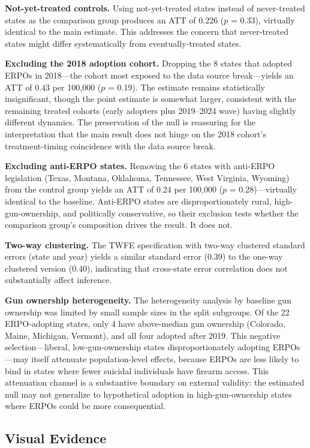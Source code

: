 \documentclass[12pt]{article}
\begin{document}
\textbf{Not-yet-treated controls.} Using not-yet-treated states instead of never-treated states as the comparison group produces an ATT of 0.226 ($p$ = 0.33), virtually identical to the main estimate. This addresses the concern that never-treated states might differ systematically from eventually-treated states.

\textbf{Excluding the 2018 adoption cohort.} Dropping the 8 states that adopted ERPOs in 2018---the cohort most exposed to the data source break---yields an ATT of 0.43 per 100,000 ($p$ = 0.19). The estimate remains statistically insignificant, though the point estimate is somewhat larger, consistent with the remaining treated cohorts (early adopters plus 2019--2024 wave) having slightly different dynamics. The preservation of the null is reassuring for the interpretation that the main result does not hinge on the 2018 cohort's treatment-timing coincidence with the data source break.

\textbf{Excluding anti-ERPO states.} Removing the 6 states with anti-ERPO legislation (Texas, Montana, Oklahoma, Tennessee, West Virginia, Wyoming) from the control group yields an ATT of 0.24 per 100,000 ($p$ = 0.28)---virtually identical to the baseline. Anti-ERPO states are disproportionately rural, high-gun-ownership, and politically conservative, so their exclusion tests whether the comparison group's composition drives the result. It does not.

\textbf{Two-way clustering.} The TWFE specification with two-way clustered standard errors (state and year) yields a similar standard error (0.39) to the one-way clustered version (0.40), indicating that cross-state error correlation does not substantially affect inference.

\textbf{Gun ownership heterogeneity.} The heterogeneity analysis by baseline gun ownership was limited by small sample sizes in the split subgroups. Of the 22 ERPO-adopting states, only 4 have above-median gun ownership (Colorado, Maine, Michigan, Vermont), and all four adopted after 2019. This negative selection---liberal, low-gun-ownership states disproportionately adopting ERPOs---may itself attenuate population-level effects, because ERPOs are less likely to bind in states where fewer suicidal individuals have firearm access. This attenuation channel is a substantive boundary on external validity: the estimated null may not generalize to hypothetical adoption in high-gun-ownership states where ERPOs could be more consequential.

\subsection{Visual Evidence}
\end{document}
